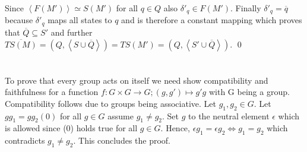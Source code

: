 \documentclass[a4paper,12pt,numbers=noenddot]{scrreport}
\def\lsk{\left<}
\def\rsk{\right>}
\begin{document}
Since $\lsk F(M') \rsk \simeq S(M')$ for all $q \in Q$ also $\delta'_q \in F(M')$.
Finally $\delta'_q = \overline{q}$ because $\delta'_q$ maps all states to $q$ and is therefore a constant mapping which proves that $\overline{Q} \subseteq S'$ and further $\overline{TS(M)}=(Q,\lsk S \cup \overline{Q} \rsk)=TS(M')=(Q,\lsk S' \cup \overline{Q} \rsk)$.
\qed
\section{}
\section{}
To prove that every group acts on itself we need show compatibility and faithfulness for a function $f: G \times G \rightarrow G; (g,g') \mapsto g'g$ with G being a group.
Compatibility follows  due to groups being associative.
Let $g_1,g_2 \in G$.
Let $gg_1 = gg_2 (0)$ for all $g \in G$ assume $g_1 \neq g_2$. Set $g$ to the neutral element $\epsilon$ which is allowed since (0) holds true for all $g \in G$.
Hence, $\epsilon g_1 = \epsilon g_2 \iff g_1 = g_2$ which contradicts $g_1 \neq g_2$.
This concludes the proof.
\end{document}
